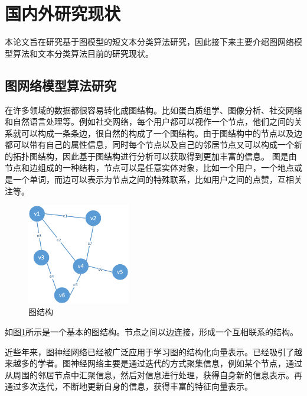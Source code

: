 \section{国内外研究现状}
本论文旨在研究基于图模型的短文本分类算法研究，因此接下来主要介绍图网络模型算法和文本分类算法目前的研究现状。

\subsection{图网络模型算法研究}
在许多领域的数据都很容易转化成图结构。比如蛋白质组学、图像分析、社交网络和自然语言处理等。例如社交网络，每个用户都可以视作一个节点，他们之间的关系就可以构成一条条边，很自然的构成了一个图结构。由于图结构中的节点以及边都可以带有自己的属性信息，同时每个节点以及自己的邻居节点又可以构成一个新的拓扑图结构，因此基于图结构进行分析可以获取得到更加丰富的信息。
图是由节点和边组成的一种结构，节点可以是任意实体对象，比如一个用户，一个地点或是一个单词，而边可以表示为节点之间的特殊联系，比如用户之间的点赞，互相关注等。
\begin{figure}[htb]%
	\setlength{\belowcaptionskip}{0pt}
	\centering
	\includegraphics[width=0.4\textwidth]{pic/1-1.png}
	\caption{图结构}
	\label{graphStruc}
\end{figure}
如图\ref{graphStruc}所示是一个基本的图结构。节点之间以边连接，形成一个互相联系的结构。

近些年来，图神经网络已经被广泛应用于学习图的结构化向量表示。已经吸引了越来越多的学者。图神经网络主要是通过迭代的方式聚集信息，例如某个节点，通过从周围的邻居节点中汇聚信息，然后对信息进行处理，获得自身新的信息表示。再通过多次迭代，不断地更新自身的信息，获得丰富的特征向量表示。

